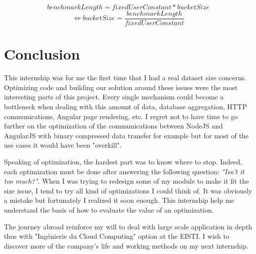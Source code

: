 \documentclass[a4paper,11pt]{report}
\begin{document}
$$ benchmarkLength = fixedUserConstant * bucketSize $$
$$\Longleftrightarrow bucketSize = \frac{benchmarkLength}{fixedUserConstant} $$

\clearpage

\chapter*{Conclusion}

This internship was for me the first time that I had a real dataset size concerns. Optimizing code and building our solution around these issues were the most interesting parts of this project. Every single mechanism could become a bottleneck when dealing with this amount of data, database aggregation, HTTP communications, Angular page rendering, etc. I regret not to have time to go further on the optimization of the communications between NodeJS and AngularJS with binary compressed data transfer for example but for most of the use cases it would have been "overkill".

Speaking of optimization, the hardest part was to know where to stop. Indeed, each optimization must be done after answering the following question: \textit{"Isn't it too much?"}. When I was trying to redesign some of my module to make it fit the size issue, I tend to try all kind of optimizations I could think of. It was obviously a mistake but fortunately I realized it soon enough. This internship help me understand the basis of how to evaluate the value of an optimization.

The journey abroad reinforce my will to deal with large scale application in depth thus with "Ingénierie du Cloud Computing" option at the EISTI. I wish to discover more of the company's life and working methods on my next internship.

\clearpage




\clearpage



\newpage

\end{document}
